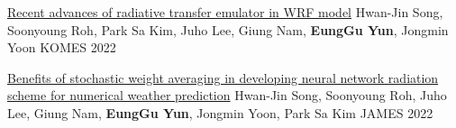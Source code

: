 \documentclass[11pt, a4paper]{cv}
\begin{document}
\begin{cvsubentries}

  \cvpublication
    {\href{https://www.dbpia.co.kr/Journal/articleDetail?nodeId=NODE11162111}{Recent advances of radiative transfer emulator in WRF model}} %
    {Hwan-Jin Song, Soonyoung Roh, Park Sa Kim, Juho Lee, Giung Nam, \textbf{EungGu Yun}, Jongmin Yoon} %
    {KOMES} %
    {2022} %
    {}

  \cvpublication
    {\href{https://doi.org/10.1029/2021MS002921}{Benefits of stochastic weight averaging in developing neural network radiation scheme for numerical weather prediction}} %
    {Hwan-Jin Song, Soonyoung Roh, Juho Lee, Giung Nam, \textbf{EungGu Yun}, Jongmin Yoon, Park Sa Kim} %
    {JAMES} %
    {2022} %
    {}

\end{cvsubentries}

\vspace{5mm}
\end{document}
